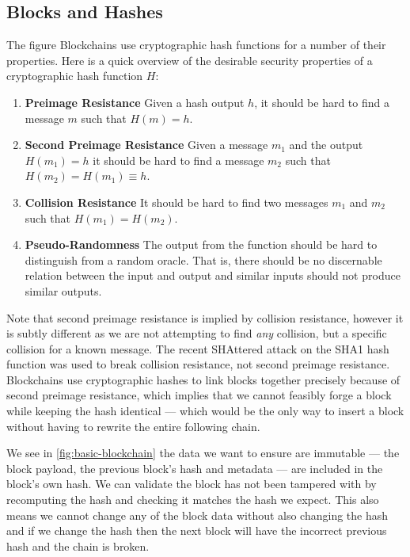 \subsection{Blocks and Hashes}
\label{ch:blockchain:structure:basics}

The figure Blockchains use cryptographic hash functions for a number of their properties. Here is a quick overview of the desirable security properties of a cryptographic hash function $H$:


\begin{enumerate}
    \item \textbf{Preimage Resistance} Given a hash output $h$, it should be hard to find a message $m$ such that $H(m) = h$.
    \item \textbf{Second Preimage Resistance} Given a message $m_1$ and the output $H(m_1) = h$ it should be hard to find a message $m_2$ such that $H(m_2) = H(m_1) \equiv h$.
    \item \textbf{Collision Resistance} It should be hard to find two messages $m_1$ and $m_2$ such that $H(m_1) = H(m_2)$.
    \item \textbf{Pseudo-Randomness} The output from the function should be hard to distinguish from a random oracle. That is, there should be no discernable relation between the input and output and similar inputs should not produce similar outputs.
\end{enumerate}

Note that second preimage resistance is implied by collision resistance, however it is subtly different as we are not attempting to find \emph{any} collision, but a specific collision for a known message. The recent SHAttered \cite{katz_first_2017} attack on the SHA1 hash function was used to break collision resistance, not second preimage resistance. Blockchains use cryptographic hashes to link blocks together precisely because of second preimage resistance, which implies that we cannot feasibly forge a block while keeping the hash identical --- which would be the only way to insert a block without having to rewrite the entire following chain.

We see in \autoref{fig:basic-blockchain} the data we want to ensure are immutable --- the block payload, the previous block's hash and metadata --- are included in the block's own hash.  We can validate the block has not been tampered with by recomputing the hash and checking it matches the hash we expect. This also means we cannot change any of the block data without also changing the hash and if we change the hash then the next block will have the incorrect previous hash and the chain is broken.


